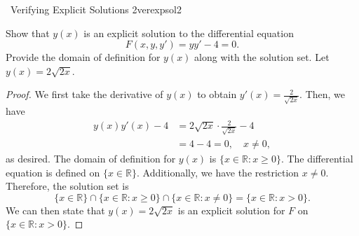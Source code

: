         \begin{example}{\Difficulty\,\Difficulty\,\,Verifying Explicit Solutions 2}{verexpsol2}
        
            Show that \(y(x)\) is an explicit solution to the differential equation
            \begin{equation*}
                F(x,y,y')=yy'-4=0.
            \end{equation*}
            Provide the domain of definition for \(y(x)\) along with the solution set. Let \(y(x)=2\sqrt{2x}\).
            \begin{proof}
                We first take the derivative of \(y(x)\) to obtain \(y'(x)=\frac{2}{\sqrt{2x}}\). Then, we have
                \begin{align*}
                    y(x)y'(x)-4&=2\sqrt{2x}\cdot\frac{2}{\sqrt{2x}}-4 \\
                    &=4-4=0,\quad x\neq0,
                \end{align*}
                as desired. The domain of definition for \(y(x)\) is \(\{x\in\mathbb{R}:x\geq0\}\). The differential equation is defined on \(\{x\in\mathbb{R}\}\). Additionally, we have the restriction \(x\neq 0\). Therefore, the solution set is 
                \begin{equation*}
                    \{x\in\mathbb{R}\}\cap\{x\in\mathbb{R}:x\geq0\}\cap\{x\in\mathbb{R}:x\neq0\}=\{x\in\mathbb{R}:x>0\}.
                \end{equation*}
                We can then state that \(y(x)=2\sqrt{2x}\) is an explicit solution for \(F\) on \(\{x\in\mathbb{R}:x>0\}\).
            \end{proof}
            
        \end{example}
